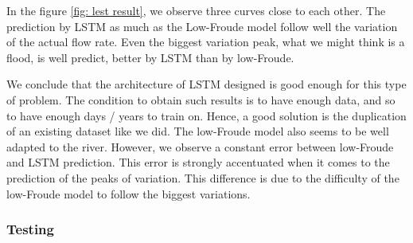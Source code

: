 In the figure \ref{fig: lest result}, we observe three curves close to each other. The prediction by LSTM as much as the Low-Froude model follow well the variation of the actual flow rate. Even the biggest variation peak, what we might think is a flood, is well predict, better by LSTM than by low-Froude. 

We conclude that the architecture of LSTM designed is good enough for this type of problem. The condition to obtain such results is to have enough data, and so to have enough days / years to train on. Hence, a good solution is the duplication of an existing dataset like we did. The low-Froude model also seems to be well adapted to the river. However, we observe a constant error between low-Froude and LSTM prediction. This error is strongly accentuated when it comes to the prediction of the peaks of variation. This difference is due to the difficulty of the low-Froude model to follow the biggest variations.

\subsubsection{Testing}
